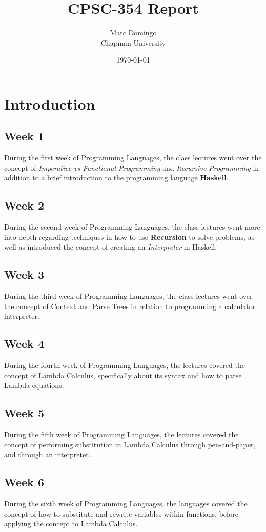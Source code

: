 \documentclass{article}
\title{CPSC-354 Report}
\author{Marc Domingo  \\ Chapman University}
\date{\today}
\theoremstyle{theorem}
\theoremstyle{definition}
\theoremstyle{remark}
\begin{document}
\maketitle
\tableofcontents

\section{Introduction}\label{introduction}
\subsection{Week 1}
\hspace{10mm} During the first week of Programming Languages, the class lectures went over the concept of \textit{Imperative vs Functional Programming} and \textit{Recursive Programming} in addition to a brief introduction to the programming language \textbf{Haskell}.
\subsection{Week 2}
\hspace{10mm} During the second week of Programming Languages, the class lectures went more into depth regarding techniques in how to use \textbf{Recursion} to solve problems, as well as introduced the concept of creating an \textit{Interpreter} in Haskell.
\subsection{Week 3} During the third week of Programming Languages, the class lectures went over the concept of Context and Parse Trees in relation to programming a calculator interpreter.
\subsection{Week 4} During the fourth week of Programming Languages, the lectures covered the concept of Lambda Calculus, specifically about its syntax and how to parse Lambda equations.
\subsection{Week 5} During the fifth week of Programming Languages, the lectures covered the concept of performing substitution in Lambda Calculus through pen-and-paper, and through an interpreter.
\subsection{Week 6} During the sixth week of Programming Languages, the languages covered the concept of how to substitute and rewrite variables within functions, before applying the concept to Lambda Calculus.
\end{document}
